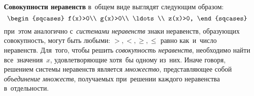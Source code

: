 \documentclass[]{scrartcl}
\begin{document}
\textbf{Совокупности неравенств} в~общем виде выглядят следующим образом:
\begin{equation}\label{eq:inequal-complex}
\begin{sqcases}
f(x)>0\\
g(x)>0\\
\ldots\\
z(x)>0,
\end{sqcases}
\end{equation}
при~этом аналогично с~\emph{системами неравенств} знаки неравенств, образующих совокупность, могут быть любыми: ${\textstyle >,<,\geq,\leq}$ равно как~и~число неравенств. Для~того, чтобы решить \emph{совокупность неравенств}, необходимо найти все~значения~${\textstyle x}$, удовлетворяющие хотя~бы одному из~них. Иначе говоря, решением системы неравенств является \emph{множество}, представляющее собой \emph{объединение множеств}, получаемых при~решении каждого неравенства в~отдельности.
\end{document}
